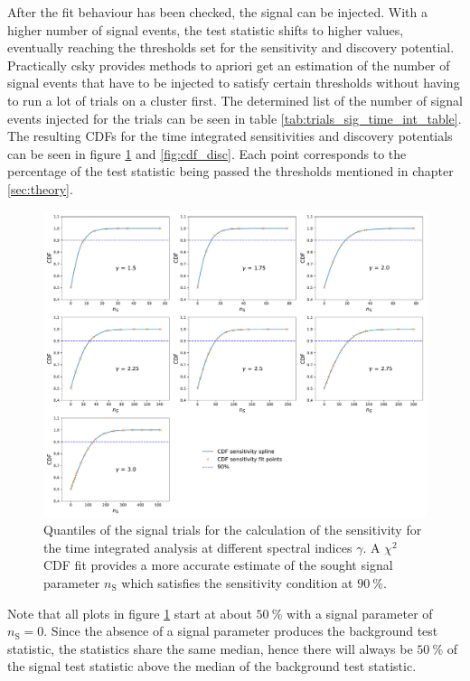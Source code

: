 After the fit behaviour has been checked, the signal can be injected.
With a higher number of signal events, the test statistic shifts to higher values, eventually reaching the thresholds set for the sensitivity and discovery potential.
Practically csky provides methods to apriori get an estimation of the number of signal events that have to be injected to satisfy certain thresholds without having to run a lot of trials on a cluster first.
The determined list of the number of signal events injected for the trials can be seen in table \ref{tab:trials_sig_time_int_table}.
The resulting CDFs for the time integrated sensitivities and discovery potentials can be seen in figure \ref{fig:cdf_sens} and \ref{fig:cdf_disc}.
Each point corresponds to the percentage of the test statistic being passed the thresholds mentioned in chapter \ref{sec:theory}.
\begin{figure}
    \centering
    \includegraphics[width=\linewidth]{Plots/05_csky/9_years_gfu_gold_cdf_sens.pdf}
    \caption{Quantiles of the signal trials for the calculation of the sensitivity for the time integrated analysis at different spectral indices $\gamma$. A $\chi^2$ CDF fit provides a more accurate estimate of the sought signal parameter $n_\text{S}$ which satisfies the sensitivity condition at $\SI{90}{\percent}$.}
    \label{fig:cdf_sens}
\end{figure}
Note that all plots in figure \ref{fig:cdf_sens} start at about $\SI{50}{\percent}$ with a signal parameter of $n_\text{S} = 0$.
Since the absence of a signal parameter produces the background test statistic, the statistics share the same median, hence there will always be $\SI{50}{\percent}$ of the signal test statistic above the median of the background test statistic.
